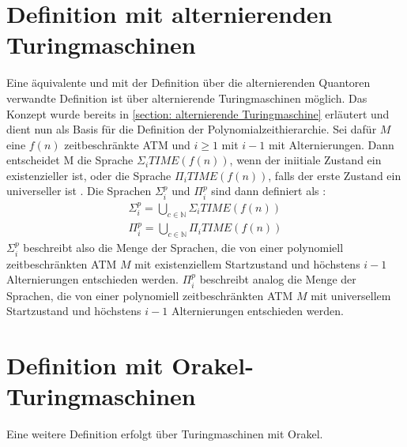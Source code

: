\section{Definition mit alternierenden Turingmaschinen} \label{section: Definition PH mit ATM}
Eine äquivalente und mit der Definition über die alternierenden Quantoren verwandte Definition ist über alternierende Turingmaschinen möglich.
Das Konzept wurde bereits in \ref{section: alternierende Turingmaschine} erläutert und dient nun als Basis für die Definition der Polynomialzeithierarchie.
Sei dafür $M$ eine $f(n)$ zeitbeschränkte ATM und $i \geq 1$  mit $i - 1$ mit  Alternierungen. Dann entscheidet M die Sprache $\Sigma_i TIME(f(n))$, wenn der iniitiale Zustand ein existenzieller ist,
oder die Sprache $\Pi_i TIME(f(n))$, falls der erste Zustand ein universeller ist \cite{arora_computational_2009}.
Die Sprachen $\Sigma^p_i$ und $\Pi^p_i$ sind dann definiert als \cite{arora_computational_2009}:
\begin{align*}
    \Sigma^p_i = \bigcup_{c \in \mathbb{N}} \Sigma_i TIME(f(n)) \\
    \Pi^p_i = \bigcup_{c \in \mathbb{N}} \Pi_i TIME(f(n))
\end{align*}
$\Sigma^p_i$ beschreibt also die Menge der Sprachen, die von einer polynomiell zeitbeschränkten ATM $M$ mit existenziellem Startzustand und höchstens $i-1$ Alternierungen entschieden werden.
$\Pi^p_i$ beschreibt analog die Menge der Sprachen, die von einer polynomiell zeitbeschränkten ATM $M$ mit universellem Startzustand und höchstens $i-1$ Alternierungen entschieden werden.
\section{Definition mit Orakel-Turingmaschinen} \label{section: Definition PH mit Orakel-Turingmaschinen}
Eine weitere Definition erfolgt über Turingmaschinen mit Orakel. 